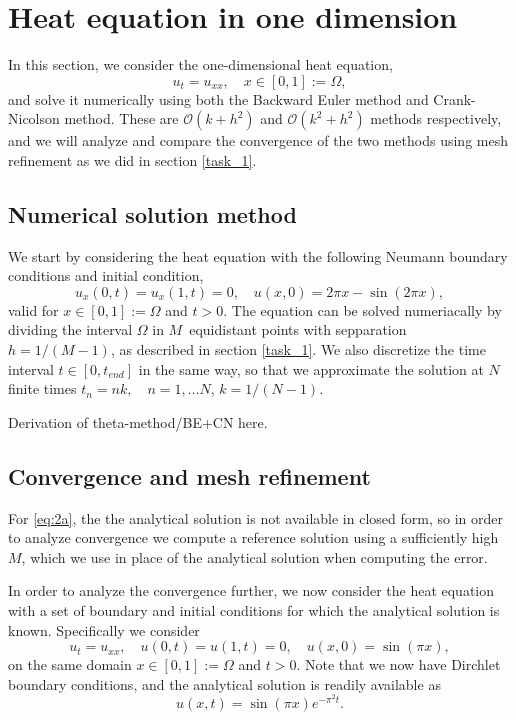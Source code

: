 \section{Heat equation in one dimension}
In this section, we consider the one-dimensional heat equation, 
\begin{equation*}
    u_t = u_{xx},   \quad x \in [0,1] := \Omega, 
    \label{eq:heat-eq}
\end{equation*}
and solve it numerically using both the Backward Euler method and Crank-Nicolson method. 
These are $\mathcal{O}(k+h^2)$ and $\mathcal{O}(k^2+h^2)$ methods respectively, 
and we will analyze and compare the convergence of the two methods using mesh refinement as we did in section \ref{task_1}. 

\subsection{Numerical solution method}
We start by considering the heat equation with the following Neumann boundary conditions and initial condition, 
\begin{equation*}
    u_x(0,t) = u_x(1,t) = 0, \quad u(x,0) = 2\pi x - \sin(2\pi x),
    \label{eq:2a}
\end{equation*}
valid for $x \in [0,1] := \Omega$ and $t > 0$. 
The equation can be solved numeriacally by dividing the interval $\Omega$ in $M$ equidistant points with sepparation $h=1/(M-1)$, 
as described in section \ref{task_1}.
We also discretize the time interval $t \in [0,t_{end}]$ in the same way, 
so that we approximate the solution at $N$ finite times $t_n = nk, \quad n = 1, \ldots N$, 
\quad $k = 1/(N-1)$.

\begin{figure}[ht]
    \centering
    
\end{figure}

Derivation of theta-method/BE+CN here.

\subsection{Convergence and mesh refinement}
For \eqref{eq:2a}, the the analytical solution is not available in closed form, 
so in order to analyze convergence we compute a reference solution using a sufficiently high $M$, 
which we use in place of the analytical solution when computing the error. 

In order to analyze the convergence further, 
we now consider the heat equation with a set of boundary and initial conditions for which the analytical solution is known. 
Specifically we consider 
\begin{equation}
    u_t = u_{xx}, \quad u(0,t) = u(1,t) = 0, \quad u(x,0) = \sin(\pi x), 
    \label{eq:2b-manufactured}
\end{equation}
on the same domain $x \in [0,1] := \Omega$ and $t > 0$. 
Note that we now have Dirchlet boundary conditions, 
and the analytical solution is readily available as
\begin{equation}
    u(x,t) = \sin(\pi x)  e^{- \pi^2 t}.
\end{equation}

